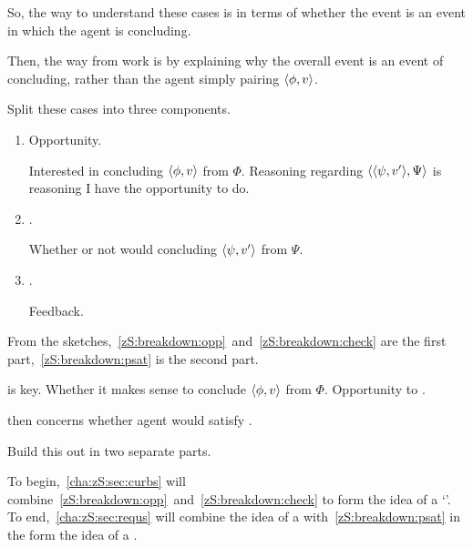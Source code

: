 \begin{note}
  So, the way to understand these cases is in terms of whether the event is an event in which the agent is concluding.

  Then, the way  from  work is by explaining why the overall event is an event of concluding, rather than the agent simply pairing \(\langle \phi, v \rangle\).
\end{note}

\begin{note}
  Split these cases into three components.
  \begin{enumerate}[label=\Roman*., ref=(\Roman*)]
  \item
    \label{zS:breakdown:opp}
    Opportunity.

    Interested in concluding \(\langle \phi, v \rangle\) from \(\Phi\).
    Reasoning regarding \(\langle \langle \psi, v' \rangle, \Psi \rangle\) is reasoning I have the opportunity to do.
  \item
    \label{zS:breakdown:check}
    .

    Whether or not would concluding \(\langle \psi, v' \rangle\) from \(\Psi\).
  \item
    \label{zS:breakdown:psat}
    .

    Feedback.
  \end{enumerate}

  From the sketches,~\ref{zS:breakdown:opp}~and~\ref{zS:breakdown:check} are the first part,~\ref{zS:breakdown:psat} is the second part.

   is key.
  Whether it makes sense to conclude \(\langle \phi, v \rangle\) from \(\Phi\).
  Opportunity to .

   then concerns whether agent would satisfy .
\end{note}

\begin{note}
  Build this out in two separate parts.

  To begin,~\autoref{cha:zS:sec:curbs} will combine~\ref{zS:breakdown:opp}~and~\ref{zS:breakdown:check} to form the idea of a `\curb{}'.
  To end,~\ref{cha:zS:sec:requs} will combine the idea of a \curb{} with~\ref{zS:breakdown:psat} in the form the idea of a \requ{}.
\end{note}

\section{}
\label{cha:zS:sec:curbs}

